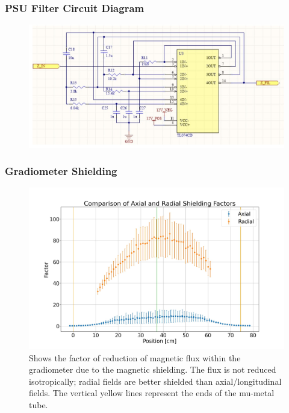 \documentclass{TheMartianReport}
\begin{document}
\subsubsection{PSU Filter Circuit Diagram}
\begin{figure}[h]
	\centering
	\includegraphics[scale=0.5]{PSU_filter_diagram}
	\caption{}
	\label{fig:PSUfilter}
\end{figure}

\pagebreak

\subsubsection{Gradiometer Shielding}
\begin{figure}[h]
	\centering
	\includegraphics[scale=0.3]{shielding_factor}
	\caption{Shows the factor of reduction of magnetic flux within the gradiometer due to the magnetic shielding. The flux is not reduced isotropically; radial fields are better shielded than axial/longitudinal fields. The vertical yellow lines represent the ends of the mu-metal tube.}
	\label{fig:ShieldingFact}
\end{figure}
\end{document}
